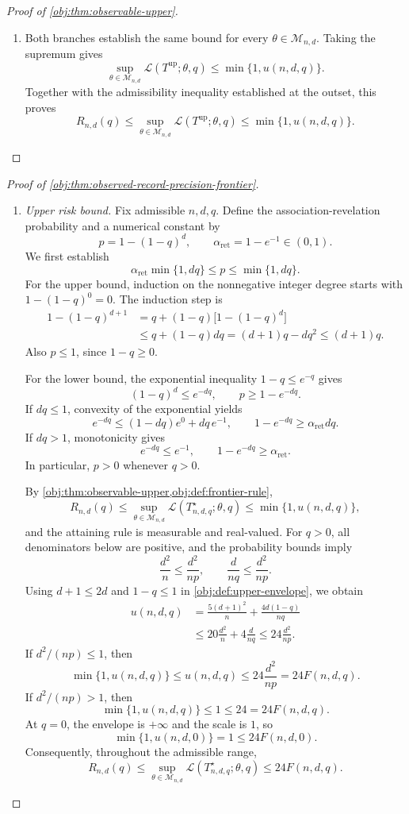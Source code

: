 \begin{proof}[Proof of \cref{obj:thm:observable-upper}]
\begin{enumerate}
\item
Both branches establish the same bound for every \(\theta\in\mathcal M_{n,d}\). Taking the supremum gives
\[
\sup_{\theta\in\mathcal M_{n,d}}
\mathcal L(T^{\mathrm{up}};\theta,q)
\le\min\{1,u(n,d,q)\}.
\]
Together with the admissibility inequality established at the outset, this proves
\[
R_{n,d}(q)
\le
\sup_{\theta\in\mathcal M_{n,d}}
\mathcal L(T^{\mathrm{up}};\theta,q)
\le
\min\{1,u(n,d,q)\}.
\]
\end{enumerate}
\end{proof}

\begin{proof}[Proof of \cref{obj:thm:observed-record-precision-frontier}]
\begin{enumerate}
\item \textit{Upper risk bound.}
Fix admissible \(n,d,q\). Define the association-revelation probability and a numerical constant by
\[
p=1-(1-q)^d,
\qquad
\alpha_{\mathrm{ret}}=1-e^{-1}\in(0,1).
\]
We first establish
\[
\alpha_{\mathrm{ret}}\min\{1,dq\}\le p\le\min\{1,dq\}.
\]
For the upper bound, induction on the nonnegative integer degree starts with
\(1-(1-q)^0=0\). The induction step is
\[
\begin{aligned}
1-(1-q)^{d+1}
&=q+(1-q)\bigl[1-(1-q)^d\bigr]\\
&\le q+(1-q)dq
=(d+1)q-dq^2
\le(d+1)q.
\end{aligned}
\]
Also \(p\le1\), since \(1-q\ge0\).

For the lower bound, the exponential inequality \(1-q\le e^{-q}\) gives
\[
(1-q)^d\le e^{-dq},
\qquad
p\ge1-e^{-dq}.
\]
If \(dq\le1\), convexity of the exponential yields
\[
e^{-dq}\le(1-dq)e^0+dq\,e^{-1},
\qquad
1-e^{-dq}\ge\alpha_{\mathrm{ret}}dq.
\]
If \(dq>1\), monotonicity gives
\[
e^{-dq}\le e^{-1},
\qquad
1-e^{-dq}\ge\alpha_{\mathrm{ret}}.
\]
In particular, \(p>0\) whenever \(q>0\).

By \cref{obj:thm:observable-upper,obj:def:frontier-rule},
\[
R_{n,d}(q)
\le
\sup_{\theta\in\mathcal M_{n,d}}
\mathcal L(T^\star_{n,d,q};\theta,q)
\le\min\{1,u(n,d,q)\},
\]
and the attaining rule is measurable and real-valued. For \(q>0\), all denominators below are positive, and the probability bounds imply
\[
\frac{d^2}{n}\le\frac{d^2}{np},
\qquad
\frac{d}{nq}\le\frac{d^2}{np}.
\]
Using \(d+1\le2d\) and \(1-q\le1\) in
\cref{obj:def:upper-envelope}, we obtain
\[
\begin{aligned}
u(n,d,q)
&=\frac{5(d+1)^2}{n}+\frac{4d(1-q)}{nq}\\
&\le20\frac{d^2}{n}+4\frac{d}{nq}
\le24\frac{d^2}{np}.
\end{aligned}
\]
If \(d^2/(np)\le1\), then
\[
\min\{1,u(n,d,q)\}
\le u(n,d,q)
\le24\frac{d^2}{np}
=24F(n,d,q).
\]
If \(d^2/(np)>1\), then
\[
\min\{1,u(n,d,q)\}\le1\le24=24F(n,d,q).
\]
At \(q=0\), the envelope is \(+\infty\) and the scale is \(1\), so
\[
\min\{1,u(n,d,0)\}=1\le24F(n,d,0).
\]
Consequently, throughout the admissible range,
\[
R_{n,d}(q)
\le
\sup_{\theta\in\mathcal M_{n,d}}
\mathcal L(T^\star_{n,d,q};\theta,q)
\le24F(n,d,q).
\]


\end{enumerate}
\end{proof}
